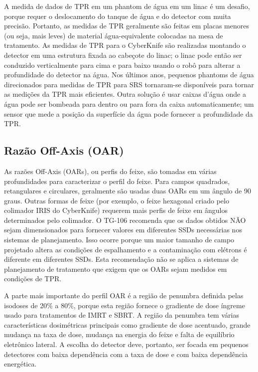 \documentclass[11pt,a4paper]{article}
\newcounter{exemplo}
\begin{document}
	A medida de dados de TPR em um phantom de água em um linac é um desafio, porque requer o deslocamento do tanque de água e do detector com muita precisão. Portanto, as medidas de TPR geralmente são feitas em placas menores (ou seja, mais leves) de material água-equivalente colocadas na mesa de tratamento. As medidas de TPR para o CyberKnife são realizadas montando o detector em uma estrutura fixada ao cabeçote do linac; o linac pode então ser conduzido verticalmente para cima e para baixo usando o robô para alterar a profundidade do detector na água. Nos últimos anos, pequenos phantoms de água direcionados para medidas de TPR para SRS tornaram-se disponíveis para tornar as medições da TPR mais eficientes. Outra solução é usar caixas d'água onde a água pode ser bombeada para dentro ou para fora da caixa automaticamente; um sensor que mede a posição da superfície da água pode fornecer a profundidade da TPR.

\subsection*{Razão Off-Axis (OAR)}

	As razões Off-Axis (OARs), ou perfis do feixe, são tomadas em várias profundidades para caracterizar o perfil do feixe. Para campos quadrados, retangulares e circulares, geralmente são usadas duas OARs em um ângulo de 90 graus. Outras formas de feixe (por exemplo, o feixe hexagonal criado pelo colimador IRIS do CyberKnife) requerem mais perfis de feixe em ângulos determinados pelo colimador. O TG-106 recomenda que os dados obtidos NÃO sejam dimensionados para fornecer valores em diferentes SSDs necessárias nos sistemas de planejamento. Isso ocorre porque um maior tamanho de campo projetado altera as condições de espalhamento e a contaminação com elétrons é diferente em diferentes SSDs. Esta recomendação não se aplica a sistemas de planejamento de tratamento que exigem que os OARs sejam medidos em condições de TPR.

	A parte mais importante do perfil OAR é a região de penumbra definida pelas isodoses de 20\% a 80\%, porque esta região fornece o gradiente de dose íngreme usado para tratamentos de IMRT e SBRT. A região da penumbra tem várias características dosimétricas principais como gradiente de dose acentuado, grande mudança na taxa de dose, mudança na energia do feixe e falta de equilíbrio eletrônico lateral. A escolha do detector deve, portanto, ser focada em pequenos detectores com baixa dependência com a taxa de dose e com baixa dependência energética.
\end{document}
